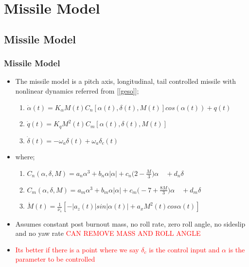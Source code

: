 \documentclass[table,10pt,red]{beamer}	%
\begin{document}
\section{Missile Model} %
\subsection{Missile Model}
	\begin{frame}
	\frametitle{Missile Model}
	 
 	\begin{itemize}  %
		\item The missile model is a pitch axis,
		longitudinal, tail controlled missile with nonlinear dynamics referred from [\ref{geso}];
		\begin{enumerate}
				\item $\dot{\alpha}(t)=	K_\alpha M(t) C_n [\alpha(t),\delta(t),M(t)]cos(\alpha(t)) + q(t) $
				\item $\dot{q}(t) =	K_q M^2(t) C_m [\alpha(t),\delta(t),M(t)]$\\
				\item $\dot{\delta}(t)	=	-\omega_a\delta(t) + \omega_a\delta_c(t)$
 		\end{enumerate}
		\end{itemize}
	\begin{itemize}
		\item  where;
			\begin{enumerate}
				\item $C_n(\alpha,\delta,M)=a_n\alpha^3+b_n\alpha|\alpha|+c_n\Big(2-\frac{M}{3}\Big)\alpha\quad+ d_n\delta$
				\item $C_m(\alpha,\delta,M)=a_m\alpha^3+b_m\alpha|\alpha|+ c_m\Big(-7+\frac{8M}{3}\Big)\alpha 
				\quad+d_m\delta$
					
				 \item $\dot{M}(t)=\frac{1}{\nu_s}[-|a_z(t)|sin|\alpha(t)|+a_xM^2(t)cos\alpha(t)]$
			\end{enumerate}
	\end{itemize}
	\begin{itemize}
		\item Assumes constant post burnout mass, no roll rate, zero roll angle, no sideslip and no yaw rate \textcolor{red}{CAN REMOVE MASS AND ROLL ANGLE}
		\item \textcolor{red}{Its better if there is a point where we say $\delta_c$ is the control input and $\alpha$ is the parameter to be controlled}
\end{itemize}


	\end{frame}
\end{document}
